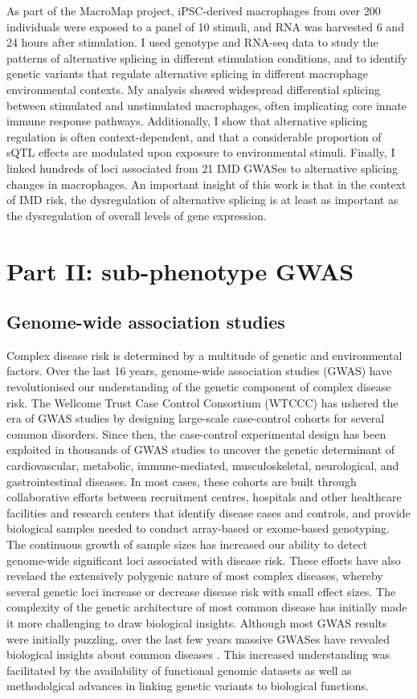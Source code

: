 As part of the MacroMap project, iPSC-derived macrophages from over 200 individuals were exposed to a panel of 10 stimuli, and RNA was harvested 6 and 24 hours after stimulation. I used genotype and RNA-seq data to study the patterns of alternative splicing in different stimulation conditions, and to identify genetic variants that regulate alternative splicing in different macrophage environmental contexts. My analysis showed widespread differential splicing between stimulated and unstimulated macrophages, often implicating core innate immune response pathways. Additionally, I show that alternative splicing regulation is often context-dependent, and that a considerable proportion of sQTL effects are modulated upon exposure to environmental stimuli. Finally, I linked hundreds of loci associated from 21 IMD GWASes to alternative splicing changes in macrophages. An important insight of this work is that in the context of IMD risk, the dysregulation of alternative splicing is at least as important as the dysregulation of overall levels of gene expression.

\section{Part II: sub-phenotype GWAS}
\subsection{Genome-wide association studies}
Complex disease risk is determined by a multitude of genetic and environmental factors. Over the last 16 years, genome-wide association studies (GWAS) have revolutionised our understanding of the genetic component of complex disease risk. The Wellcome Trust Case Control Consortium (WTCCC) has ushered the era of GWAS studies by designing large-scale case-control cohorts for several common disorders. Since then, the case-control experimental design has been exploited in thousands of GWAS studies to uncover the genetic determinant of cardiovascular, metabolic, immune-mediated, musculoskeletal, neurological, and gastrointestinal diseases. In most cases, these cohorts are built through collaborative efforts between recruitment centres, hospitals and other healthcare facilities and research centers that identify disease cases and controls, and provide biological samples needed to conduct array-based or exome-based genotyping. The continuous growth of sample sizes has increased our ability to detect genome-wide significant loci associated with disease risk. These efforts have also revelaed the extensively polygenic nature of most complex diseases, whereby several genetic loci increase or decrease disease risk with small effect sizes. The complexity of the genetic architecture of most common disease has initially made it more challenging to draw biological insights. Although most GWAS results were initially puzzling, over the last few years massive GWASes have revealed biological insights about common diseases \cite{Xue2018-ni,Aragam2022-ep}. This increased understanding was facilitated by the availability of functional genomic datasets as well as methodolgical advances in linking genetic variants to biological functions. 

